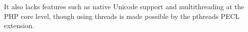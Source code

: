 It also lacks features such as native Unicode support and multithreading at the PHP core level, though using threads is made possible by the pthreads PECL extension.



















































































